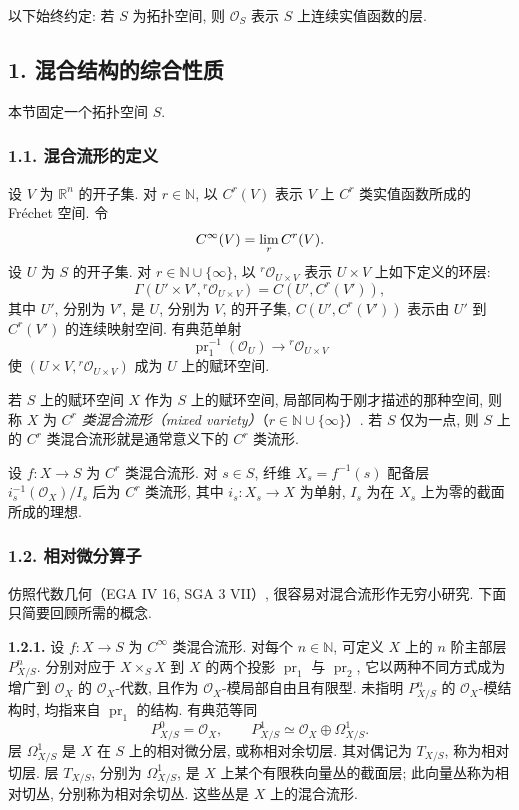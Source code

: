 以下始终约定: 若 $S$ 为拓扑空间, 则 $\mathcal O_S$ 表示 $S$ 上连续实值函数的层.

\subsection*{1. 混合结构的综合性质}

本节固定一个拓扑空间 $S$.

\subsubsection*{1.1. 混合流形的定义}

设 $V$ 为 $\mathbb R^n$ 的开子集. 对 $r\in\mathbb N$, 以 $C^r(V)$ 表示 $V$ 上 $C^r$ 类实值函数所成的 Fréchet 空间. 令
\[
 C^\infty(V)=\operatorname*{lim}_r C^r(V).
\]
设 $U$ 为 $S$ 的开子集. 对 $r\in\mathbb N\cup\{\infty\}$, 以 ${}^r\mathcal O_{U\times V}$ 表示 $U\times V$ 上如下定义的环层:
\[
 \Gamma(U'\times V',{}^r\mathcal O_{U\times V})
 =C(U',C^r(V')),
\]
其中 $U'$, 分别为 $V'$, 是 $U$, 分别为 $V$, 的开子集, $C(U',C^r(V'))$ 表示由 $U'$ 到 $C^r(V')$ 的连续映射空间. 有典范单射
\[
 \operatorname{pr}_1^{-1}(\mathcal O_U)\longrightarrow {}^r\mathcal O_{U\times V}
\]
使 $(U\times V,{}^r\mathcal O_{U\times V})$ 成为 $U$ 上的赋环空间.

若 $S$ 上的赋环空间 $X$ 作为 $S$ 上的赋环空间, 局部同构于刚才描述的那种空间, 则称 $X$ 为 \emph{$C^r$ 类混合流形（mixed variety）}（$r\in\mathbb N\cup\{\infty\}$）. 若 $S$ 仅为一点, 则 $S$ 上的 $C^r$ 类混合流形就是通常意义下的 $C^r$ 类流形.

设 $f:X\to S$ 为 $C^r$ 类混合流形. 对 $s\in S$, 纤维 $X_s=f^{-1}(s)$ 配备层 $i_s^{-1}(\mathcal O_X)/I_s$ 后为 $C^r$ 类流形, 其中 $i_s:X_s\to X$ 为单射, $I_s$ 为在 $X_s$ 上为零的截面所成的理想.

\subsubsection*{1.2. 相对微分算子}

仿照代数几何（EGA IV 16, SGA 3 VII）, 很容易对混合流形作无穷小研究. 下面只简要回顾所需的概念.

\textbf{1.2.1.} 设 $f:X\to S$ 为 $C^\infty$ 类混合流形. 对每个 $n\in\mathbb N$, 可定义 $X$ 上的 $n$ 阶主部层 $P^n_{X/S}$. 分别对应于 $X\times_SX$ 到 $X$ 的两个投影 $\operatorname{pr}_1$ 与 $\operatorname{pr}_2$, 它以两种不同方式成为增广到 $\mathcal O_X$ 的 $\mathcal O_X$-代数, 且作为 $\mathcal O_X$-模局部自由且有限型. 未指明 $P^n_{X/S}$ 的 $\mathcal O_X$-模结构时, 均指来自 $\operatorname{pr}_1$ 的结构. 有典范等同
\[
 P^0_{X/S}=\mathcal O_X,
 \qquad
 P^1_{X/S}\simeq\mathcal O_X\oplus\Omega^1_{X/S}.
\]
层 $\Omega^1_{X/S}$ 是 $X$ 在 $S$ 上的相对微分层, 或称相对余切层. 其对偶记为 $T_{X/S}$, 称为相对切层. 层 $T_{X/S}$, 分别为 $\Omega^1_{X/S}$, 是 $X$ 上某个有限秩向量丛的截面层; 此向量丛称为相对切丛, 分别称为相对余切丛. 这些丛是 $X$ 上的混合流形.

